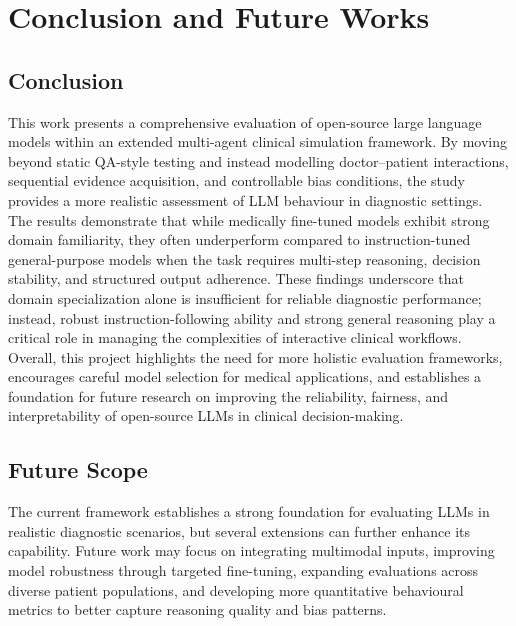 
\chapter{Conclusion and Future Works} %

\label{Chapter 5} %


\section{Conclusion}
This work presents a comprehensive evaluation of open-source large language models within an extended multi-agent clinical simulation framework. By moving beyond static QA-style testing and instead modelling doctor–patient interactions, sequential evidence acquisition, and controllable bias conditions, the study provides a more realistic assessment of LLM behaviour in diagnostic settings. \\

The results demonstrate that while medically fine-tuned models exhibit strong domain familiarity, they often underperform compared to instruction-tuned general-purpose models when the task requires multi-step reasoning, decision stability, and structured output adherence. These findings underscore that domain specialization alone is insufficient for reliable diagnostic performance; instead, robust instruction-following ability and strong general reasoning play a critical role in managing the complexities of interactive clinical workflows.  \\

Overall, this project highlights the need for more holistic evaluation frameworks, encourages careful model selection for medical applications, and establishes a foundation for future research on improving the reliability, fairness, and interpretability of open-source LLMs in clinical decision-making.

\section{Future Scope}
The current framework establishes a strong foundation for evaluating LLMs in realistic diagnostic scenarios, but several extensions can further enhance its capability. Future work may focus on integrating multimodal inputs, improving model robustness through targeted fine-tuning, expanding evaluations across diverse patient populations, and developing more quantitative behavioural metrics to better capture reasoning quality and bias patterns.

